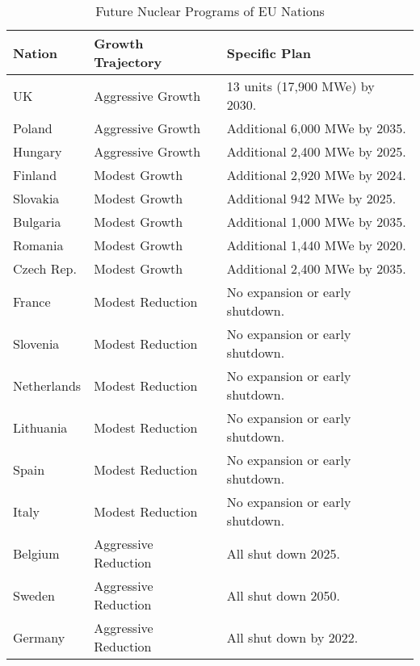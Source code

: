 \begin{table}[h]
	\centering
		\begin{tabularx}{\textwidth}{lmb}
			\hline 
					
					\textbf{Nation} & \textbf{Growth Trajectory} & \textbf{Specific Plan }\\
					\hline
					UK & Aggressive Growth & {\small  13 units (17,900 MWe) by 2030.}\\
					\hline
					Poland & Aggressive Growth &  {\small Additional 6,000 MWe by 2035.}\\
					\hline
					Hungary & Aggressive Growth &  {\small Additional 2,400 MWe by 2025.} \\ 
					\hline
					Finland & Modest Growth &  {\small Additional 2,920 MWe by 2024.}\\
					\hline
					Slovakia & Modest Growth & {\small Additional 942 MWe by 2025.}\\
					\hline
					Bulgaria & Modest Growth &  {\small Additional 1,000 MWe by 2035.} \\
					\hline
					Romania & Modest Growth &  {\small Additional 1,440 MWe by 2020.} \\
					\hline
					Czech Rep. & Modest Growth & {\small  Additional 2,400 MWe by 2035.}\\
					\hline
					France & Modest Reduction & {\small No expansion or early shutdown.}\\
					\hline
					Slovenia & Modest Reduction & {\small No expansion or early shutdown.}\\
					\hline
					Netherlands & Modest Reduction & {\small No expansion or early shutdown.}\\
					\hline
					Lithuania & Modest Reduction & {\small No expansion or early shutdown.}\\
					\hline 
					Spain & Modest Reduction &  {\small No expansion or early shutdown.} \\
					\hline
					Italy & Modest Reduction & {\small No expansion or early shutdown. }\\
					\hline
					Belgium & Aggressive Reduction & All shut down 2025.\\
					\hline
					Sweden & Aggressive Reduction & All shut down 2050.\\
					\hline
					Germany & Aggressive Reduction & All shut down by 2022.\\
					\hline
					
		\end{tabularx}

	\caption {Future Nuclear Programs of \gls{EU} Nations \cite{world_nuclear_association_nuclear_2017}}
  \label{tab:eu_growth}
\end{table}
\FloatBarrier
